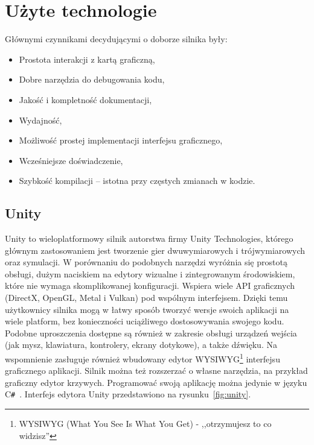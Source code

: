 \chapter*{Użyte technologie}
Głównymi czynnikami decydującymi o doborze silnika były:
\begin{itemize}
	\item Prostota interakcji z kartą graficzną,
	\item Dobre narzędzia do debugowania kodu,
	\item Jakość i kompletność dokumentacji,
	\item Wydajność,
	\item Możliwość prostej implementacji interfejsu graficznego,
	\item Wcześniejsze doświadczenie,
	\item Szybkość kompilacji -- istotna przy częstych zmianach w kodzie.
\end{itemize}
\section*{Unity}
Unity to wieloplatformowy silnik autorstwa firmy Unity Technologies, którego głównym zastosowaniem jest tworzenie gier dwuwymiarowych i trójwymiarowych oraz symulacji. W porównaniu do podobnych narzędzi wyróżnia się prostotą obsługi, dużym naciskiem na edytory wizualne i zintegrowanym środowiskiem, które nie wymaga skomplikowanej konfiguracji. Wspiera wiele API graficznych (DirectX, OpenGL, Metal i Vulkan)\cite{UnityManualGraphicsApiSupport} pod wspólnym interfejsem. Dzięki temu użytkownicy silnika mogą w łatwy sposób tworzyć wersje swoich aplikacji na wiele platform, bez konieczności uciążliwego dostosowywania swojego kodu. Podobne uproszczenia dostępne są również w zakresie obsługi urządzeń wejścia (jak mysz, klawiatura, kontrolery, ekrany dotykowe), a także dźwięku. Na wspomnienie zasługuje również wbudowany edytor WYSIWYG\footnote{WYSIWYG (What You See Is What You Get) - ,,otrzymujesz to co widzisz''} interfejsu graficznego aplikacji. Silnik można też rozszerzać o własne narzędzia, na przykład graficzny edytor krzywych. Programować swoją aplikację można jedynie w języku C\texttt{\#}~\cite{ProgramminginUnity}. Interfejs edytora Unity przedstawiono na rysunku~\ref{fig:unity}.
